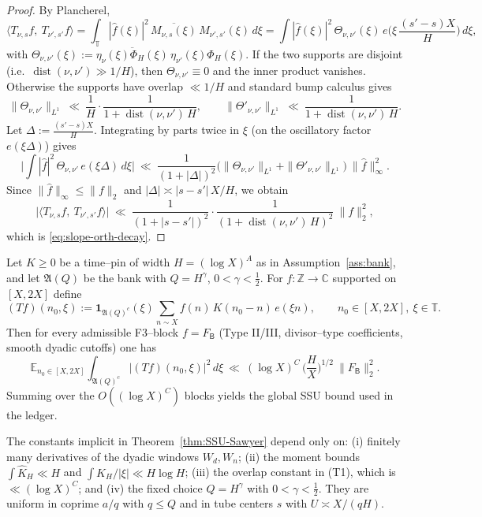 \begin{proof}
By Plancherel,
\[
\langle T_{\nu,s}f,\ T_{\nu',s'}f\rangle
=\int_{\mathbb T} |\widehat f(\xi)|^2\,\overline{M_{\nu,s}(\xi)}\,M_{\nu',s'}(\xi)\,d\xi
=\int |\widehat f(\xi)|^2\,\Theta_{\nu,\nu'}(\xi)\,e\!\Big(\xi\,\frac{(s'-s)X}{H}\Big)\,d\xi,
\]
with $\Theta_{\nu,\nu'}(\xi):=\overline{\eta_\nu(\xi)\Phi_H(\xi)}\,\eta_{\nu'}(\xi)\Phi_H(\xi)$.  
If the two supports are disjoint (i.e.\ $\operatorname{dist}(\nu,\nu')\gg 1/H$), then $\Theta_{\nu,\nu'}\equiv0$ and the inner product vanishes. Otherwise the supports have overlap $\ll 1/H$ and standard bump calculus gives
\[
\|\Theta_{\nu,\nu'}\|_{L^1}\ \ll\ \frac{1}{H}\cdot\frac{1}{1+\operatorname{dist}(\nu,\nu')\,H},\qquad
\|\Theta'_{\nu,\nu'}\|_{L^1}\ \ll\ \frac{1}{1+\operatorname{dist}(\nu,\nu')\,H}.
\]
Let $\Delta:=\frac{(s'-s)X}{H}$. Integrating by parts twice in $\xi$ (on the oscillatory factor $e(\xi\Delta)$) gives
\[
\Big|\int |\widehat f|^2\,\Theta_{\nu,\nu'}\,e(\xi\Delta)\,d\xi\Big|
\ \ll\ \frac{1}{(1+|\Delta|)^2}\Big(\|\Theta_{\nu,\nu'}\|_{L^1} + \|\Theta'_{\nu,\nu'}\|_{L^1}\Big)\ \|\widehat f\|_\infty^2.
\]
Since $\|\widehat f\|_\infty\le \|f\|_2$ and $|\Delta|\asymp |s-s'|\,X/H$, we obtain
\[
\big|\langle T_{\nu,s}f,\ T_{\nu',s'}f\rangle\big|
\ \ll\ \frac{1}{(1+|s-s'|)^2}\cdot\frac{1}{(1+\operatorname{dist}(\nu,\nu')\,H)^2}\ \|f\|_2^2,
\]
which is \eqref{eq:slope-orth-decay}.
\end{proof}


\begin{theorem}\label{thm:SSU-Sawyer}
Let $K\ge0$ be a time–pin of width $H=(\log X)^A$ as in Assumption~\ref{ass:bank}, and let $\mathfrak A(Q)$ be the bank with $Q=H^\gamma$, $0<\gamma<\tfrac12$. For $f:\mathbb Z\to\mathbb C$ supported on $[X,2X]$ define
\[
(Tf)(n_0,\xi):=\mathbf 1_{\mathfrak A(Q)^c}(\xi)\sum_{n\sim X} f(n)\,K(n_0-n)\,e(\xi n),\qquad n_0\in[X,2X],\ \xi\in\mathbb T.
\]
Then for every admissible F3–block $f=F_{\mathsf B}$ (Type II/III, divisor–type coefficients, smooth dyadic cutoffs) one has
\begin{equation}\label{eq:SSU-strong}
\mathbb E_{n_0\in[X,2X]}\int_{\mathfrak A(Q)^c} |(Tf)(n_0,\xi)|^2\,d\xi
\ \ll\ (\log X)^C\,\Big(\frac{H}{X}\Big)^{1/2}\ \|F_{\mathsf B}\|_2^2.
\end{equation}
Summing over the $O((\log X)^C)$ blocks yields the global SSU bound used in the ledger.
\end{theorem}

\begin{remark}\label{rem:ssu-uniformity}
The constants implicit in Theorem~\ref{thm:SSU-Sawyer} depend only on:
(i) finitely many derivatives of the dyadic windows $W_d,W_n$;
(ii) the moment bounds $\int\widehat K_H\ll H$ and $\int \widehat K_H/|\xi|\ll H\log H$;
(iii) the overlap constant in (T1), which is $\ll(\log X)^C$;
and (iv) the fixed choice $Q=H^\gamma$ with $0<\gamma<\tfrac12$.
They are uniform in coprime $a/q$ with $q\le Q$ and in tube centers $s$ with $U\asymp X/(qH)$.
\end{remark}


